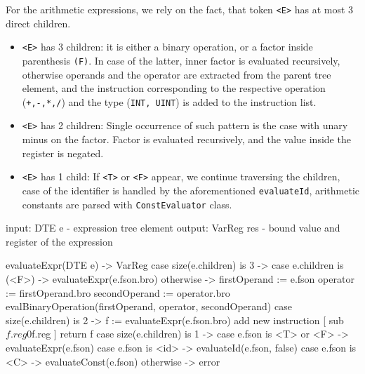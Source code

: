 \newpage
For the arithmetic expressions, we rely on the fact, that token \verb+<E>+ has at most 3 direct children.
\begin{itemize}
\item \verb+<E>+ has 3 children: it is either a binary operation, or a factor inside parenthesis \verb+(F)+.
In case of the latter, inner factor is evaluated recursively, otherwise operands and the operator are extracted from the
parent tree element, and the instruction corresponding to the respective operation (\verb_+,-,*,/_) and the type (\verb+INT, UINT+)
is added to the instruction list.
\item \verb+<E>+ has 2 children: Single occurrence of such pattern is the case with unary minus on the factor. Factor is
evaluated recursively, and the value inside the register is negated.
\item \verb+<E>+ has 1 child: If \verb+<T>+ or \verb+<F>+ appear, we continue traversing the children, case of the
identifier is handled by the aforementioned \verb+evaluateId+, arithmetic constants are parsed with \verb+ConstEvaluator+ class.
\end{itemize}
\begin{codeblock}[evaluateExpr]
input: DTE e - expression tree element
output: VarReg res - bound value and register of the expression

evaluateExpr(DTE e) -> VarReg {
    case size(e.children) is 3 -> {
        case e.children is (<F>) -> evaluateExpr(e.fson.bro)
        otherwise -> {
            firstOperand := e.fson
            operator := firstOperand.bro
            secondOperand := operator.bro
            evalBinaryOperation(firstOperand, operator, secondOperand)
        }
    }
    case size(e.children) is 2 -> {
        f := evaluateExpr(e.fson.bro)
        add new instruction [ sub $f.reg 0 $f.reg ]
        return f
    }
    case size(e.children) is 1 -> {
        case e.fson is <T> or <F> -> evaluateExpr(e.fson)
        case e.fson is <id> -> evaluateId(e.fson, false)
        case e.fson is <C> -> evaluateConst(e.fson)
    }
    otherwise -> error
}
\end{codeblock}

